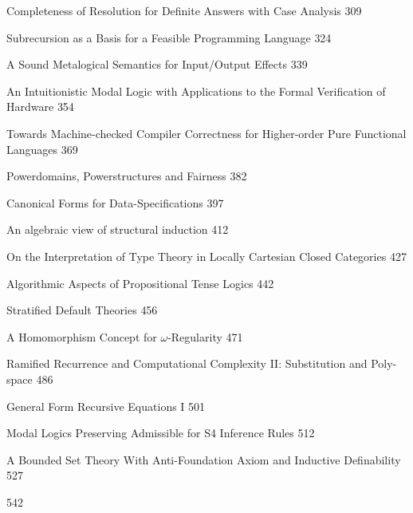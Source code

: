 {Completeness of Resolution for Definite Answers with Case Analysis} {309}

{Subrecursion as a Basis for a Feasible Programming Language} {324}
\medskip


{A Sound Metalogical Semantics for Input/Output Effects} {339}

 {An Intuitionistic Modal Logic with Applications to the Formal Verification of Hardware} {354}

{Towards Machine-checked Compiler Correctness for Higher-order Pure Functional 
Languages}
{369}

 {Powerdomains, Powerstructures and Fairness} {382}

{Canonical Forms for Data-Specifications} {397}\medskip




{An algebraic view of structural induction} {412}

{On the Interpretation of Type Theory in Locally Cartesian Closed Categories} {427}
\medskip





 {Algorithmic Aspects of Propositional Tense Logics} {442}

{Stratified Default Theories}
{456}

{A Homomorphism Concept for $\omega$-Regularity} {471}

 {Ramified Recurrence and Computational Complexity II: Substitution and Poly-space} {486}

{General Form Recursive Equations I}
{501}

{Modal Logics Preserving Admissible for S4 Inference Rules} {512}

{A Bounded Set Theory With Anti-Foundation Axiom and Inductive Definability} {527}
\medskip

\vspace{.5cm}
{542}


